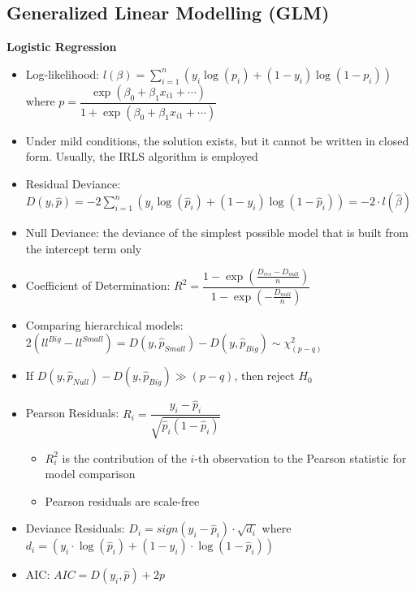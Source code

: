 \documentclass[a4paper]{article}
\begin{document}
\subsection{Generalized Linear Modelling (GLM)}

\textbf{Logistic Regression}
\begin{itemize}
    \item Log-likelihood: $l(\beta)=\sum_{i=1}^{n}\left( y_i\log(p_i)+(1-y_i)\log(1-p_i)\right)$ where $p=\dfrac{\exp(\beta_0+\beta_1x_{i1}+\cdots)}{1+\exp(\beta_0+\beta_1x_{i1}+\cdots)}$
    \item Under mild conditions, the solution exists, but it cannot be written in closed form. Usually, the IRLS algorithm is employed
    \item Residual Deviance: $D(y,\hat{p})=-2\sum_{i=1}^{n}\left(y_i\log(\hat{p}_i)+(1-y_i)\log(1-\hat{p}_i) \right)=-2\cdot l(\hat{\beta})$
    \item Null Deviance: the deviance of the simplest possible model that is built from the intercept term only
    \item Coefficient of Determination: $R^2=\dfrac{1-\exp(\frac{D_{res}-D_{null}}{n})}{1-\exp(-\frac{D_{null}}{n})}$
    \item Comparing hierarchical models: $2(ll^{Big}-ll^{Small})=D(y,\hat{p}_{Small})-D(y,\hat{p}_{Big})\sim\chi_{(p-q)}^2$
    \item If $D(y,\hat{p}_{Null})-D(y,\hat{p}_{Big})\gg(p-q)$, then reject $H_0$
    \item Pearson Residuals: $R_i=\dfrac{y_i-\hat{p}_i}{\sqrt{\hat{p}_i(1-\hat{p}_i)}}$
    \begin{itemize}
        \item $R_i^2$ is the contribution of the $i$-th observation to the Pearson statistic for model comparison
        \item Pearson residuals are scale-free
    \end{itemize}
    \item Deviance Residuals: $D_i=sign(y_i-\hat{p}_i)\cdot\sqrt{d_i}$ where $d_i=\left(y_i\cdot\log(\hat{p}_i)+(1-y_i)\cdot\log(1-\hat{p}_i) \right)$
    \item AIC: $AIC=D(y_i,\hat{p})+2p$
\end{itemize}
\end{document}
